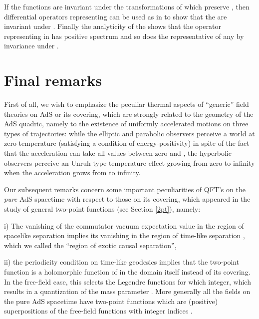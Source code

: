 \documentclass[a4paper,a4paper]{article}
\let\UnmodifSec=\section
\renewcommand{\section}{\setcounter{equation}{0}\UnmodifSec}
\def\bR{{\bf R}}
\def\CC{{\cal C}}
\def\GG{{\cal G}}
\def\HH{{\cal H}}
\def\WW{{\cal W}}
\def\wh{\widehat}
\def\wt{\widetilde}
\def\wXcdn{{\wt X_d^{(c)n}}}
\begin{document}
If the functions \myHighlight{$\wt S_n$}\coordHE{} are
invariant under the transformations of \myHighlight{$\wt G_0^{(c)}$}\coordHE{} which preserve
\myHighlight{$\{z \in \wXcdn\ :\ z^0 \in i\bR^n,\ \ \vec{z} \in \bR^{n(d-1)}\}$}\coordHE{},
then differential operators representing \myHighlight{$\GG$}\coordHE{} can be used as in
\cite{OS1} to show that the \myHighlight{$\WW_n$}\coordHE{} are invariant under \myHighlight{$\wt G_0$}\coordHE{}.
Finally the analyticity of the \myHighlight{$\WW_n$}\coordHE{} shows that the operator
\myHighlight{$\wh M_{0d}$}\coordHE{} representing \coordHE{} in \myHighlight{$\HH$}\coordHE{} has positive spectrum
and so does the representative \myHighlight{$\wh M$}\coordHE{} of any \myHighlight{$M \in \CC_1$}\coordHE{} by invariance
under \myHighlight{$\wt G_0$}\coordHE{}.


\section{Final remarks}
\label{O}

First of all, we wish to emphasize the peculiar thermal aspects of
``generic'' field theories on AdS or its covering,
which are strongly related to the
geometry of the AdS quadric, namely to the existence of
uniformly accelerated motions on three types of trajectories:
while the elliptic and parabolic observers perceive a
world at zero temperature (satisfying a condition
of energy-positivity)
in spite of the fact that the acceleration can take all values
between zero and \coordHE{}, the hyperbolic observers
perceive an Unruh-type temperature effect growing from zero to
infinity when the acceleration grows from \coordHE{}
to infinity.

Our subsequent remarks
concern some important peculiarities of QFT's on the {\sl pure} AdS
spacetime with respect to those on its covering, which appeared
in the study of general two-point functions
(see Section \ref{2pt}), namely:

i) The vanishing of the commutator vacuum expectation value in the region of
spacelike separation \coordHE{}
implies its vanishing in the region of time-like separation
\coordHE{}, which we called the ``region of
exotic causal separation'',

ii) the periodicity condition on time-like geodesics implies that
the two-point function is a holomorphic function of
\coordHE{} in the domain \coordHE{} itself
instead of its covering. In the free-field case, this selects
the Legendre functions \coordHE{} for which
\myHighlight{$\lambda = \ell$}\coordHE{} integer, which results in a quantization of the
mass parameter \coordHE{}.  More generally
all the fields on the pure AdS spacetime have
two-point functions which are (positive) superpositions
of the
free-field functions
\coordHE{} with integer indices \myHighlight{$\ell$}\coordHE{}.
\end{document}
